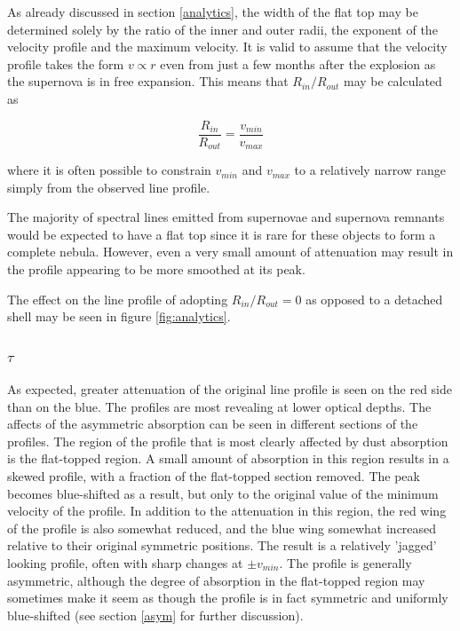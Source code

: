 \documentclass[useAMS,usenatbib,usegraphicx]{mnras}
\begin{document}
As already discussed in section \ref{analytics}, the width of the flat top 
may be determined solely by the ratio of the inner and outer radii, the 
exponent of the velocity profile and the maximum velocity.  It is valid to 
assume that the velocity profile takes the form $v \propto r$ even from 
just a few months after the explosion as the supernova is in free 
expansion.  This means that $R_{in}/R_{out}$ may be calculated as

\[
\frac{R_{in}}{R_{out}}=\frac{v_{min}}{v_{max}}
\]

\noindent where it is often possible to constrain $v_{min}$ and $v_{max}$ 
to a relatively narrow range simply from the observed line profile.

The majority of spectral lines emitted from supernovae and supernova 
remnants would be expected to have a flat top since it is rare for these 
objects to form a complete nebula.  However, even a very small amount of 
attenuation may result in the profile appearing to be more smoothed at its 
peak.

The effect on the line profile of adopting $R_{in}/R_{out}=0$ as opposed 
to a detached shell may be seen in figure \ref{fig:analytics}.

\subsubsection{$\tau$}
\label{tau}

As expected, greater attenuation of the original line profile is seen on 
the red side than on the blue.  The profiles are most revealing at lower 
optical depths.  The affects of the asymmetric absorption can be seen in 
different sections of the profiles.  The region of the profile that is 
most clearly affected by dust absorption is the flat-topped region.  A 
small amount of absorption in this region results in a skewed profile, 
with a fraction of the flat-topped section removed.  The peak becomes 
blue-shifted as a result, but only to the original value of the minimum 
velocity of the profile. In addition to the attenuation in this region, 
the red wing of the profile is also somewhat reduced, and the blue wing 
somewhat increased relative to their original symmetric positions.  The 
result is a relatively 'jagged' looking profile, often with sharp changes 
at $\pm v_{min}$.  The profile is generally asymmetric, although the 
degree of absorption in the flat-topped region may sometimes make it seem 
as though the profile is in fact symmetric and uniformly blue-shifted (see 
section \ref{asym} for further discussion).
\end{document}
